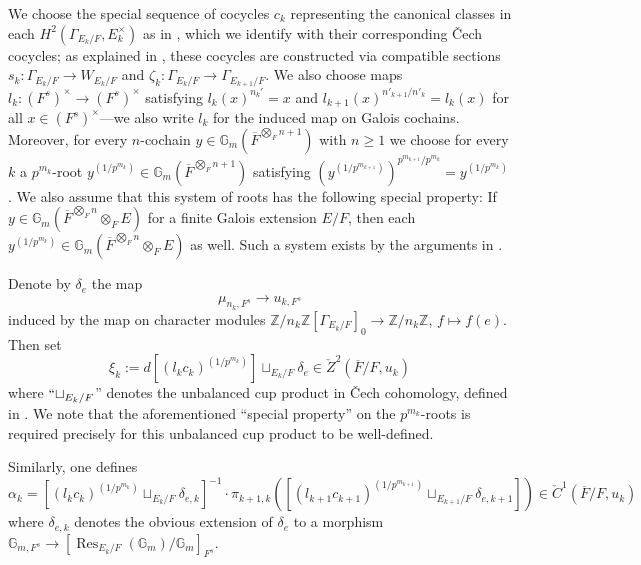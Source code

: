 \documentclass{amsart}
\theoremstyle{definition}
\theoremstyle{remark}
\DeclareMathOperator\Res{Res}
\newcommand\bbZ{\mathbb{Z}}
\newcommand{\ov}{\overline}
\begin{document}
We choose the special sequence of cocycles $c_{k}$ representing the canonical classes in each $H^{2}(\Gamma_{E_{k}/F},E_{k}^{\times})$ as in \cite[\S 4.4]{kaletha16}, which we identify with their corresponding \v{C}ech cocycles; as explained in \cite[\S 4.4]{kaletha16}, these cocycles are constructed via compatible sections $s_{k} \colon \Gamma_{E_{k}/F} \to W_{E_{k}/F}$  and $\zeta_{k} \colon \Gamma_{E_{k}/F} \to \Gamma_{E_{k+1}/F}$. We also choose maps $l_{k} \colon (F^{s})^{\times} \to (F^{s})^{\times}$ satisfying $l_{k}(x)^{n_{k}'} = x$ and $l_{k+1}(x)^{n'_{k+1}/n'_{k}} = l_{k}(x)$ for all $x \in (F^{s})^{\times}$---we also write $l_{k}$ for the induced map on Galois cochains. Moreover, for every $n$-cochain $y \in \mathbb{G}_{m}(\ov{F}^{\bigotimes_{F} n+1})$ with $n \geq 1$ we choose for every $k$ a $p^{m_{k}}$-root $y^{(1/p^{m_{k}})} \in \mathbb{G}_{m}(\ov{F}^{\bigotimes_{F} n+1})$ satisfying $(y^{(1/p^{m_{k+1}})})^{p^{m_{k+1}}/p^{m_{k}}} = y^{(1/p^{m_{k}})}$. We also assume that this system of roots has the following special property: If $y \in \mathbb{G}_{m}(\ov{F}^{\bigotimes_{F} n} \otimes_{F} E)$ for a finite Galois extension $E/F$, then each $y^{(1/p^{m_{k}})} \in  \mathbb{G}_{m}(\ov{F}^{\bigotimes_{F} n} \otimes_{F} E)$ as well. Such a system exists by the arguments in \cite[\S 4.3]{Dillery1}.

Denote by $\delta_{e}$ the map 
\begin{equation*}
\mu_{n_{k},F^{s}} \to u_{k,F^{s}}
\end{equation*}
induced by the map on character modules $\bbZ/n_{k}\bbZ[\Gamma_{E_{k}/F}]_{0} \to \bbZ/n_{k}\bbZ$, $f \mapsto f(e)$. Then set
\begin{equation*}
    \xi_{k} :=d[(l_{k}c_{k})^{(1/p^{m_{k}})}] \sqcup_{E_{k}/F} \delta_{e} \in \check{Z}^{2}(\ov{F}/F, u_{k})
\end{equation*}
where $``\sqcup_{E_{k}/F}$'' denotes the unbalanced cup product in \v{C}ech cohomology, defined in \cite[\S 4.2]{Dillery1}. We note that the aforementioned ``special property'' on the $p^{m_{k}}$-roots is required precisely for this unbalanced cup product to be well-defined.

Similarly, one defines
\begin{equation*}
    \alpha_{k} = [(l_{k}c_{k})^{(1/p^{m_{k}})} \sqcup_{E_{k}/F} \delta_{e,k}]^{-1} \cdot \pi_{k+1,k}( [(l_{k+1}c_{k+1})^{(1/p^{m_{k+1}})} \sqcup_{E_{k+1}/F} \delta_{e,k+1}]) \in \check{C}^{1}(\ov{F}/F,u_{k})
\end{equation*}
where $\delta_{e,k}$ denotes the obvious extension of $\delta_{e}$ to a morphism $\mathbb{G}_{m,F^{s}} \to [\Res_{E_{k}/F}(\mathbb{G}_{m})/\mathbb{G}_{m}]_{F^{s}}$.
\end{document}
